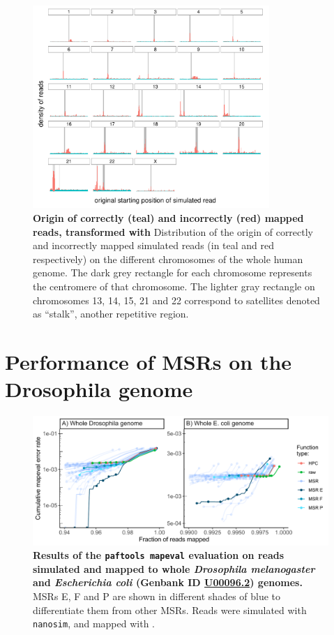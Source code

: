 \documentclass[
  11pt,
  twoside]{scrbook}
\newcommand{\extcaption}[2]{
    \caption[#1]{
        \textbf{#1}\newline
        #2
    }
}
\begin{document}
\begin{figure}[H]
    \centering
    \includegraphics[width=0.8\textwidth]{figures/HPC-MSRs/msr_f2_distrib.centro.pdf}
    \extcaption{Origin of correctly (teal) and incorrectly (red) mapped reads, transformed with \msr{F}}{Distribution of the origin of correctly and incorrectly mapped simulated reads (in teal and red respectively) on the different chromosomes of the whole human genome. The dark grey rectangle for each chromosome represents the centromere of that chromosome. The lighter gray rectangle on chromosomes 13, 14, 15, 21 and 22 correspond to satellites denoted as ``stalk'', another repetitive region.}
    \label{fig:hist-msr-f}
\end{figure}

\hypertarget{performance-of-msrs-on-the-drosophila-genome}{%
\section{Performance of MSRs on the Drosophila genome}\label{performance-of-msrs-on-the-drosophila-genome}}

\begin{figure}[H]
    \centering
    \includegraphics[width=\textwidth]{figures/HPC-MSRs/droso_ecoli.pdf}
    \extcaption{Results of the \texttt{paftools mapeval} evaluation on reads simulated and mapped to whole \textit{Drosophila melanogaster} and \textit{Escherichia coli} (Genbank ID \href{https://www.ncbi.nlm.nih.gov/nuccore/U00096.2}{U00096.2}) genomes.}{MSRs E, F and P are shown in different shades of blue to differentiate them from other MSRs. Reads were simulated with \texttt{nanosim}, and mapped with \minimap.}
    \label{fig:drosophila-results}
\end{figure}
\newpage
\end{document}
